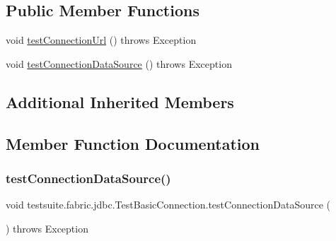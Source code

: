 \subsection*{Public Member Functions}
\begin{DoxyCompactItemize}
\item 
void \mbox{\hyperlink{classtestsuite_1_1fabric_1_1jdbc_1_1_test_basic_connection_a755a5edbb2f2b38995e5b0ec295a6835}{test\+Connection\+Url}} ()  throws Exception 
\item 
void \mbox{\hyperlink{classtestsuite_1_1fabric_1_1jdbc_1_1_test_basic_connection_a86081e38cdb6f9233486dcb721716dd2}{test\+Connection\+Data\+Source}} ()  throws Exception 
\end{DoxyCompactItemize}
\subsection*{Additional Inherited Members}


\subsection{Member Function Documentation}
\mbox{\label{classtestsuite_1_1fabric_1_1jdbc_1_1_test_basic_connection_a86081e38cdb6f9233486dcb721716dd2}} 
\subsubsection{\texorpdfstring{test\+Connection\+Data\+Source()}{testConnectionDataSource()}}
{\footnotesize\ttfamily void testsuite.\+fabric.\+jdbc.\+Test\+Basic\+Connection.\+test\+Connection\+Data\+Source (\begin{DoxyParamCaption}{ }\end{DoxyParamCaption}) throws Exception}

